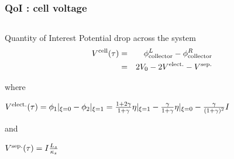 \documentclass[10pt,xcolor=dvipsnames,compress]{beamer}
\begin{document}
\begin{frame}
\frametitle{QoI : cell voltage }
\vfill


\begin{columns}
\begin{column}{.52\textwidth}
\begin{alertblock}{Quantity of Interest}
 Potential drop across the system
 \begin{eqnarray*}
 V^{\rm cell}(\tau) &=& \phi_{\rm collector}^L - \phi_{\rm collector}^R \\
 		&=& 2V_0 - 2V^{\rm elect.} - V^{\rm sep.}
 \end{eqnarray*}

where 

$
V^{\rm elect.}(\tau) =  \phi_{\rm 1}|_{\xi=0} - \phi_{\rm 2}|_{\xi=1} = \frac{1+2\gamma}{1+\gamma}\eta|_{\xi=1} - \frac{\gamma}{1+\gamma}\eta|_{\xi=0} 
 - \frac{\gamma}{(1+\gamma)^2}I
$

and

$
V^{\rm sep.}(\tau) =  
I\frac{L_s}{\kappa_s}
$

\end{alertblock}


\end{column}
\end{columns}
\end{frame}
\end{document}
